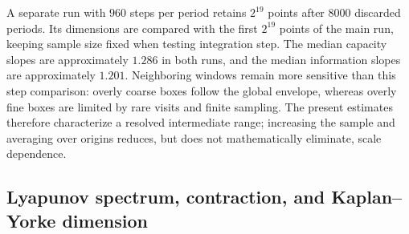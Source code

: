 \documentclass[aps,prb,reprint,floatfix]{revtex4-2}
\begin{document}
A separate run with $960$ steps per period retains $2^{19}$ points after $8000$ discarded periods. Its dimensions are compared with the first $2^{19}$ points of the main run, keeping sample size fixed when testing integration step. The median capacity slopes are approximately $1.286$ in both runs, and the median information slopes are approximately $1.201$. Neighboring windows remain more sensitive than this step comparison: overly coarse boxes follow the global envelope, whereas overly fine boxes are limited by rare visits and finite sampling. The present estimates therefore characterize a resolved intermediate range; increasing the sample and averaging over origins reduces, but does not mathematically eliminate, scale dependence.

\subsection{Lyapunov spectrum, contraction, and Kaplan--Yorke dimension}
\end{document}
